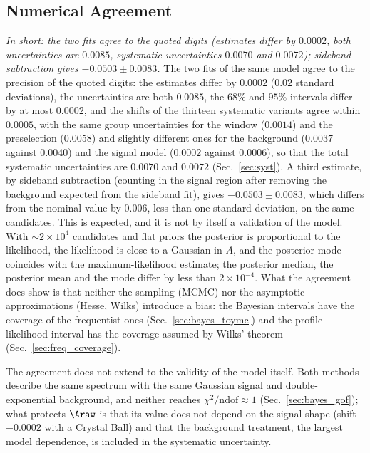 \subsection{Numerical Agreement}
\label{sec:comparison_numbers}
\emph{In short: the two fits agree to the quoted digits (estimates differ by $0.0002$, both uncertainties are $0.0085$, systematic uncertainties $0.0070$ and $0.0072$); sideband subtraction gives $-0.0503\pm0.0083$.}
The two fits of the same model agree to the precision of the quoted digits: the estimates differ by $0.0002$ ($0.02$ standard deviations), the uncertainties are both $0.0085$, the $68\%$ and $95\%$ intervals differ by at most $0.0002$, and the shifts of the thirteen systematic variants agree within $0.0005$, with the same group uncertainties for the window ($0.0014$) and the preselection ($0.0058$) and slightly different ones for the background ($0.0037$ against $0.0040$) and the signal model ($0.0002$ against $0.0006$), so that the total systematic uncertainties are $0.0070$ and $0.0072$ (Sec.~\ref{sec:syst}). A third estimate, by sideband subtraction (counting in the signal region after removing the background expected from the sideband fit), gives $-0.0503\pm0.0083$, which differs from the nominal value by $0.006$, less than one standard deviation, on the same candidates. This is expected, and it is not by itself a validation of the model. With $\sim2\times10^4$ candidates and flat priors the posterior is proportional to the likelihood, the likelihood is close to a Gaussian in $A$, and the posterior mode coincides with the maximum-likelihood estimate; the posterior median, the posterior mean and the mode differ by less than $2\times10^{-4}$. What the agreement does show is that neither the sampling (MCMC) nor the asymptotic approximations (Hesse, Wilks) introduce a bias: the Bayesian intervals have the coverage of the frequentist ones (Sec.~\ref{sec:bayes_toymc}) and the profile-likelihood interval has the coverage assumed by Wilks' theorem (Sec.~\ref{sec:freq_coverage}).

The agreement does not extend to the validity of the model itself. Both methods describe the same spectrum with the same Gaussian signal and double-exponential background, and neither reaches $\chi^2/\mathrm{ndof}\approx1$ (Sec.~\ref{sec:bayes_gof}); what protects $\Araw$ is that its value does not depend on the signal shape (shift $-0.0002$ with a Crystal Ball) and that the background treatment, the largest model dependence, is included in the systematic uncertainty.

